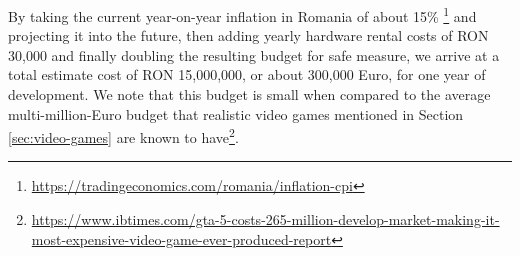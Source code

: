 By taking the current year-on-year inflation in Romania of about 15\% \footnote{\url{https://tradingeconomics.com/romania/inflation-cpi}} and projecting it into the future, then adding yearly hardware rental costs of RON 30,000 and finally doubling the resulting budget for safe measure, we arrive at a total estimate cost of RON 15,000,000, or about 300,000 Euro, for one year of development. We note that this budget is small when compared to the average multi-million-Euro budget that realistic video games mentioned in Section \ref{sec:video-games} are known to have\footnote{\url{https://www.ibtimes.com/gta-5-costs-265-million-develop-market-making-it-most-expensive-video-game-ever-produced-report}}.

